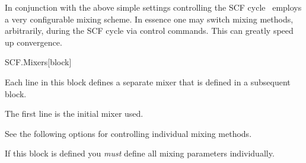 In conjunction with the above simple settings controlling the SCF
cycle \siesta\ employs a very configurable mixing scheme. In essence
one may switch mixing methods, arbitrarily, during the SCF cycle via
control commands. This can greatly speed up convergence. 

\begin{fdfentry}{SCF.Mixers}[block]
  
  Each line in this block defines a separate mixer that is defined in
  a subsequent  block.

  The first line is the initial mixer used.

  See the following options for controlling individual mixing
  methods. 
  
  \note If this block is defined you \emph{must} define all mixing
  parameters individually.

\end{fdfentry}


